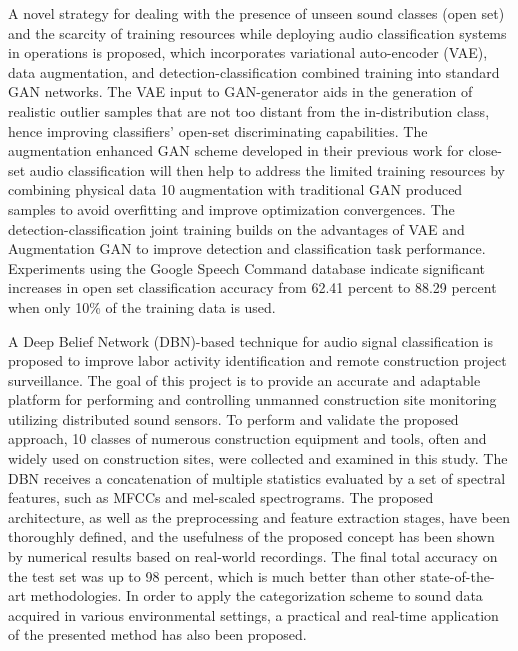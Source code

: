 A novel strategy for dealing with the presence of unseen sound classes (open set) and the scarcity of training resources \parencite{6} while deploying audio classification systems in operations is proposed, which incorporates variational auto-encoder (VAE), data augmentation, and detection-classification combined training into standard GAN networks. The VAE input to GAN-generator aids in the generation of realistic outlier samples that are not too distant from the in-distribution class, hence improving classifiers' open-set discriminating capabilities. The augmentation enhanced GAN scheme developed in their previous work for close-set audio classification will then help to address the limited training resources by combining physical data 10 augmentation with traditional GAN produced samples to avoid overfitting and improve optimization convergences. The detection-classification joint training builds on the advantages of VAE and Augmentation GAN to improve detection and classification task performance. Experiments using the Google Speech Command database indicate significant increases in open set classification accuracy from 62.41 percent to 88.29 percent when only 10\% of the training data is used. 

A Deep Belief Network (DBN)-based technique \parencite{7} for audio signal classification is proposed to improve labor activity identification and remote construction project surveillance. The goal of this project is to provide an accurate and adaptable platform for performing and controlling unmanned construction site monitoring utilizing distributed sound sensors. To perform and validate the proposed approach, 10 classes of numerous construction equipment and tools, often and widely used on construction sites, were collected and examined in this study. The DBN receives a concatenation of multiple statistics evaluated by a set of spectral features, such as MFCCs and mel-scaled spectrograms. The proposed architecture, as well as the preprocessing and feature extraction stages, have been thoroughly defined, and the usefulness of the proposed concept has been shown by numerical results based on real-world recordings. The final total accuracy on the test set was up to 98 percent, which is much better than other state-of-the-art methodologies. In order to apply the categorization scheme to sound data acquired in various environmental settings, a practical and real-time application of the presented method has also been proposed. 

